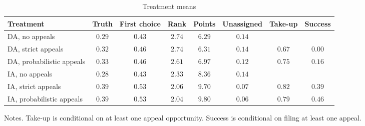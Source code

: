 \begin{table}[htbp]
\centering
\caption{Treatment means}
\label{tab:treatment_means_rep}
\begin{tabular}{lccccccc}
\toprule
Treatment & Truth & First choice & Rank & Points & Unassigned & Take-up & Success \\
\midrule
DA, no appeals & \(0.29\) & \(0.43\) & \(2.74\) & \(6.29\) & \(0.14\) &  &  \\
DA, strict appeals & \(0.32\) & \(0.46\) & \(2.74\) & \(6.31\) & \(0.14\) & \(0.67\) & \(0.00\) \\
DA, probabilistic appeals & \(0.33\) & \(0.46\) & \(2.61\) & \(6.97\) & \(0.12\) & \(0.75\) & \(0.16\) \\
IA, no appeals & \(0.28\) & \(0.43\) & \(2.33\) & \(8.36\) & \(0.14\) &  &  \\
IA, strict appeals & \(0.39\) & \(0.53\) & \(2.06\) & \(9.70\) & \(0.07\) & \(0.82\) & \(0.39\) \\
IA, probabilistic appeals & \(0.39\) & \(0.53\) & \(2.04\) & \(9.80\) & \(0.06\) & \(0.79\) & \(0.46\) \\
\bottomrule
\end{tabular}
\begin{flushleft}\footnotesize Notes. Take-up is conditional on at least one appeal opportunity. Success is conditional on filing at least one appeal.\end{flushleft}
\end{table}
